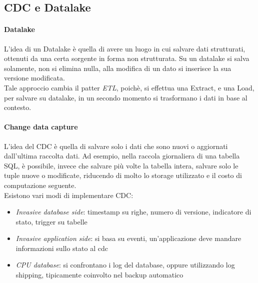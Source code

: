 \subsection{CDC e Datalake}

\paragraph{Datalake}
L'idea di un Datalake è quella di avere un luogo in cui salvare dati strutturati, 
ottenuti da una certa sorgente in forma non strutturata. Su un datalake si salva 
solamente, non si elimina nulla, alla modifica di un dato si inserisce la sua versione 
modificata.\\
Tale approccio cambia il patter \emph{ETL}, poichè, si effettua una Extract, e una 
Load, per salvare su datalake, in un secondo momento si trasformano i dati in base 
al contesto.

\paragraph{Change data capture}
L'idea del CDC è quella di salvare solo i dati che sono nuovi o aggiornati dall'ultima
raccolta dati. Ad esempio, nella raccola giornaliera di una tabella SQL, è possibile, 
invece che salvare più volte la tabella intera, salvare solo le tuple nuove o 
modificate, riducendo di molto lo storage utilizzato e il costo di computazione 
seguente.\\
Esistono vari modi di implementare CDC:
\begin{itemize}
    \item \emph{Invasive database side}: timestamp su righe, numero di versione, 
    indicatore di stato, trigger su tabelle
    \item \emph{Invasive application side}: si basa su eventi, un'applicazione deve mandare 
    informazioni sullo stato al cdc 
    \item \emph{CPU database}: si confrontano i log del database, oppure utilizzando log shipping, 
    tipicamente coinvolto nel backup automatico
\end{itemize}

